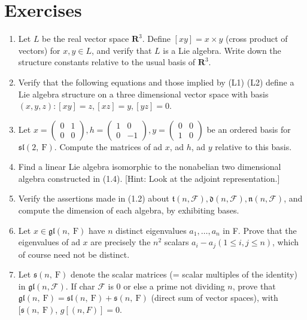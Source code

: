 \documentclass[10pt]{article}
\begin{document}
\section*{Exercises}
\begin{enumerate}
  \item Let $L$ be the real vector space $\mathbf{R}^{3}$. Define $[x y]=x \times y$ (cross product of vectors) for $x, y \in L$, and verify that $L$ is a Lie algebra. Write down the structure constants relative to the usual basis of $\mathbf{R}^{3}$.
  \item Verify that the following equations and those implied by (L1) (L2) define a Lie algebra structure on a three dimensional vector space with basis $(x, y, z):[x y]=z,[x z]=y,[y z]=0$.
  \item Let $x=\left(\begin{array}{ll}0 & 1 \\ 0 & 0\end{array}\right), h=\left(\begin{array}{rr}1 & 0 \\ 0 & -1\end{array}\right), y=\left(\begin{array}{ll}0 & 0 \\ 1 & 0\end{array}\right)$ be an ordered basis for $\mathfrak{s l}(2, \mathrm{~F})$. Compute the matrices of ad $x$, ad $h$, ad $y$ relative to this basis.
  \item Find a linear Lie algebra isomorphic to the nonabelian two dimensional algebra constructed in (1.4). [Hint: Look at the adjoint representation.]
  \item Verify the assertions made in (1.2) about $\mathfrak{t}(n, \mathcal{F}), \mathfrak{d}(n, \mathcal{F}), \mathfrak{n}(n, \mathcal{F})$, and compute the dimension of each algebra, by exhibiting bases.
  \item Let $x \in \mathfrak{g l}(n, \mathrm{~F})$ have $n$ distinct eigenvalues $a_{1}, \ldots, a_{n}$ in F. Prove that the eigenvalues of ad $x$ are precisely the $n^{2}$ scalars $a_{i}-a_{j}(1 \leq i, j \leq n)$, which of course need not be distinct.
  \item Let $\mathfrak{s}(n, \mathrm{~F})$ denote the scalar matrices (= scalar multiples of the identity) in $\mathfrak{g l}(n, \mathcal{F})$. If char $\mathcal{F}$ is 0 or else a prime not dividing $n$, prove that $\mathfrak{g l}(n, \mathrm{~F})=\mathfrak{s l}(n, \mathrm{~F})+\mathfrak{s}(n, \mathrm{~F})$ (direct sum of vector spaces), with $[\mathfrak{s}(n, \mathrm{~F})$, $g[(n, F)]=0$.

\end{enumerate}
\end{document}
